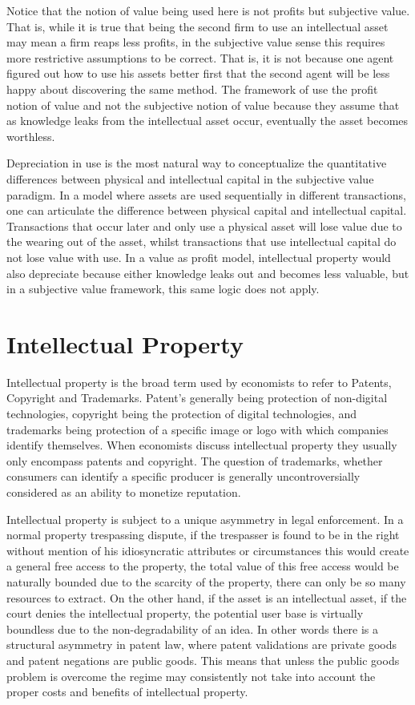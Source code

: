 \documentclass[12pt]{article}
\numberwithin{equation}{section}
\begin{document}
Notice that the notion of value being used here is not profits but subjective value. That is, while it is true that being the second firm to use an intellectual asset may mean a firm reaps less profits, in the subjective value sense this requires more restrictive assumptions to be correct. That is, it is not because one agent figured out how to use his assets better first that the second agent will be less happy about discovering the same method. The framework of \cite{anton1994expropriation} use the profit notion of value and not the subjective notion of value because they assume that as knowledge leaks from the intellectual asset occur, eventually the asset becomes worthless. 

Depreciation in use is the most natural way to conceptualize the quantitative differences between physical and intellectual capital in the subjective value paradigm. In a model where assets are used sequentially in different transactions, one can articulate the difference between physical capital and intellectual capital. Transactions that occur later and only use a physical asset will lose value due to the wearing out of the asset, whilst transactions that use intellectual capital do not lose value with use. In a value as profit model, intellectual property would also depreciate because either knowledge leaks out and becomes less valuable, but in a subjective value framework, this same logic does not apply. 

\section{Intellectual Property}

Intellectual property is the broad term used by economists to refer to Patents, Copyright and Trademarks. Patent's generally being protection of non-digital technologies, copyright being the protection of digital technologies, and trademarks being protection of a specific image or logo with which companies identify themselves. When economists discuss intellectual property they usually only encompass patents and copyright. The question of trademarks, whether consumers can identify a specific producer is generally uncontroversially considered as an ability to monetize reputation.

Intellectual property is subject to a unique asymmetry in legal enforcement. In a normal property trespassing dispute, if the trespasser is found to be in the right without mention of his idiosyncratic attributes or circumstances this would create a general free access to the property, the total value of this free access would be naturally bounded due to the scarcity of the property, there can only be so many resources to extract. On the other hand, if the asset is an intellectual asset, if the court denies the intellectual property, the potential user base is virtually boundless due to the non-degradability of an idea. In other words there is a structural asymmetry in patent law, where patent validations are private goods and patent negations are public goods. This means that unless the public goods problem is overcome the regime may consistently not take into account the proper costs and benefits of intellectual property.
\end{document}
